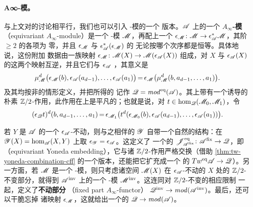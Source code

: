 \paragraph{A∞-模。}\label{sub:equivariant-a-infinity-modules}
与上文对\trTwistedComplex{}的讨论相平行，我们也可以引入 \trAinfty-模的一个%
\trEquivariant{}版本。$\mathscr{A}$ 上的一个\textbf{\trEquivariant{} $A_\infty$-模}
（equivariant $A_\infty$-module）是一个 \trAinfty-模 $\mathscr{M}$，再配上一个%
\trModule\trHomomorphism{}%
$\epsilon_{\mathscr{M}}\colon\mathscr{M}\to\epsilon_{\mathscr{A}}^*\mathscr{M}$，其阶 $\ge 2$ 的各项为
零，并且 $\epsilon_{\mathscr{M}}$ 与 $\epsilon_{\mathscr{A}}^*(\epsilon_{\mathscr{M}})$ 的%
\trComposition{}无论按哪个次序都是恒等\trModule{}\trEndomorphism。具体地说，这份附加
数据由一族映射 $\epsilon_{\mathscr{M}}\colon\mathscr{M}(X)\to\mathscr{M}(\epsilon_{\mathscr{A}}(X))$
组成，对 $X$ 与 $\epsilon_{\mathscr{A}}(X)$ 的这两个映射互逆，并且它们与 $\epsilon_{\mathscr{A}}$
\trCompatible，其意义是
\begin{equation*}
\medmuskip=1.5mu\relax\thickmuskip=3mu\relax
\mu^d_{\scr{M}}\bigl(\epsilon_{\scr{M}}(b),\epsilon_{\scr{A}}(a_{d-1}),\ldots,
\epsilon_{\scr{A}}(a_1)\bigr)
=\epsilon_{\scr{M}}\bigl(\mu^d_{\scr{M}}(b,a_{d-1},\ldots,a_1)\bigr).
\end{equation*}
\trMorphism{}及其\trComposition{}均按非\trEquivariant{}的情形定义，并把所得的%
\trACategory{}记作 $\mathscr{Q}=\mathit{mod}^{\mathrm{eq}}(\mathscr{A})$。其上带有一个诱导的
朴素 $\mathbb{Z}/2$-作用，此作用在\trObject{}上是平凡的；也就是说，对
$t\in\hom_{\mathscr{Q}}(\mathscr{M}_0,\mathscr{M}_1)$，令
\begin{equation*}
\medmuskip=1.5mu\relax\thickmuskip=3mu\relax
(\epsilon_{\scr{Q}}t)^d(b,a_{d-1},\ldots,a_1)
=\epsilon_{\scr{M}_1}\bigl(t^d(\epsilon_{\scr{M}_0}(b),\epsilon_{\scr{A}}(a_{d-1}),
\ldots,\epsilon_{\scr{A}}(a_1))\bigr).
\end{equation*}

若 $Y$ 是 $\mathscr{A}$ 的一个 $\epsilon_{\mathscr{A}}$-不动\trObject，则与之相伴的%
\trYoneda{}\trModule{} $\mathscr{Y}$ 自带一个自然的\trEquivariant{}结构：在
$\mathscr{Y}(X)=\hom_{\mathscr{A}}(X,Y)$ 上取 $\epsilon_{\mathscr{Y}}=\epsilon_{\mathscr{A}}$。这定义了
一个\trCohomology\trFullyFaithful{}的 \trAFunctor{}%
$\mathscr{J}^{\mathrm{eq}}_{\mathscr{A}^{\mathrm{fix}}}\colon
\mathscr{A}^{\mathrm{fix}}\to\mathscr{Q}$，即\textbf{\trEquivariant\trYonedaEmbedding}
（equivariant Yoneda embedding），它与诸 $\mathbb{Z}/2$-作用严格交换（借助%
\cref{thm:tw-yoneda-combination-cff} 的一个\trEquivariant{}版本，还能把它扩充成一个%
\trCohomology\trFullyFaithful{}的\trFunctor{}%
$Tw^{\mathrm{eq}}\mathscr{A}\to\mathscr{Q}$）。另一方面，若 $\mathscr{M}$ 是一个\trEquivariant{}
\trAinfty-模，则只考虑诸空间 $\mathscr{M}(X)$ 在 $\epsilon_{\mathscr{A}}$-不动的 $X$ 处的
$\mathbb{Z}/2$-不变部分，就得到 $\mathscr{A}^{\mathrm{inv}}$ 上的一个 \trAinfty-模
$\mathscr{M}^{\mathrm{inv}}$。这连同对 $\mathbb{Z}/2$-不变\trNaturalTransformation{}的相应限制
一起，定义了\textbf{不动部分 \trAFunctor}（fixed part $A_\infty$-functor）
$\mathscr{Q}^{\mathrm{inv}}\to\mathit{mod}(\mathscr{A}^{\mathrm{inv}})$。最后，还可以干脆忘掉
诸映射 $\epsilon_{\mathscr{M}}$，这就给出一个\trFullyFaithful{}的 \trAFunctor{}%
$\mathscr{Q}\to\mathit{mod}(\mathscr{A})$。

